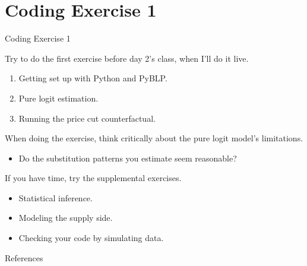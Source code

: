 \documentclass[aspectratio=169,t,11pt,table]{beamer}
\begin{document}
\section{Coding Exercise 1}

\begin{frame}{Coding Exercise 1}
    \begin{wideitemize}
        \item Try to do the first exercise before day 2's class, when I'll do it live.
        \begin{enumerate}
            \item Getting set up with Python and PyBLP.
            \item Pure logit estimation.
            \item Running the price cut counterfactual.
        \end{enumerate}
        \pause
        \item When doing the exercise, think critically about the pure logit model's limitations.
        \begin{itemize}
            \item Do the substitution patterns you estimate seem reasonable?
        \end{itemize}
        \pause
        \item If you have time, try the supplemental exercises.
        \begin{itemize}
            \item Statistical inference.
            \item Modeling the supply side.
            \item Checking your code by simulating data.
        \end{itemize}
    \end{wideitemize}
\end{frame}

\backupbegin

\begin{frame}{References}
    
\end{frame}

\backupend
\end{document}
